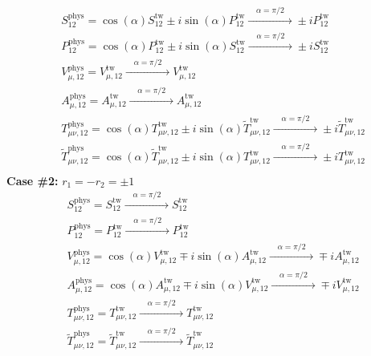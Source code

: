 \documentclass[english, LaM, oneside, noexaminfo]{sapthesis}
\begin{document}
\begin{equation}\label{eq:OS-twisted-currents-equal-r}
    \begin{aligned}
        & S_{12}^\text{phys} = \cos (\alpha) S_{12}^\text{tw} \pm i \sin (\alpha) P_{12}^\text{tw} \xrightarrow{\quad \alpha = \pi/2 \quad} \pm i P^\text{tw}_{12}\\
        & P_{12}^\text{phys} = \cos (\alpha) P_{12}^\text{tw} \pm i \sin (\alpha) S_{12}^\text{tw} \xrightarrow{\quad \alpha = \pi/2 \quad} \pm i S^\text{tw}_{12}\\
        & V_{\mu,12}^\text{phys} = V_{\mu,12}^\text{tw} \xrightarrow{\quad \alpha = \pi/2 \quad} V_{\mu,12}^\text{tw}\\
        & A_{\mu,12}^\text{phys} = A_{\mu,12}^\text{tw} \xrightarrow{\quad \alpha = \pi/2 \quad} A_{\mu,12}^\text{tw}\\
        & T_{\mu\nu,12}^\text{phys} = \cos (\alpha) T_{\mu\nu,12}^\text{tw} \pm i \sin (\alpha) \tilde{T}_{\mu\nu,12}^\text{tw} \xrightarrow{\quad \alpha = \pi/2 \quad} \pm i \tilde{T}_{\mu\nu,12}^\text{tw} \\
        & \tilde{T}_{\mu\nu,12}^\text{phys} = \cos (\alpha) \tilde{T}_{\mu\nu,12}^\text{tw} \pm i \sin (\alpha) T_{\mu\nu,12}^\text{tw} \xrightarrow{\quad \alpha = \pi/2 \quad} \pm i T_{\mu\nu,12}^\text{tw} \\
    \end{aligned}
\end{equation}
\newline
{\bf Case \#2: } $r_1 = - r_2 = \pm 1$
\begin{equation}\label{eq:OS-twisted-currents-defferent-r}
    \begin{aligned}
        & S_{12}^\text{phys} = S_{12}^\text{tw} \xrightarrow{\quad \alpha = \pi/2 \quad} S^\text{tw}_{12}\\
        & P_{12}^\text{phys} = P_{12}^\text{tw} \xrightarrow{\quad \alpha = \pi/2 \quad} P^\text{tw}_{12}\\
        & V_{\mu,12}^\text{phys} = \cos (\alpha) V_{\mu,12}^\text{tw} \mp i \sin (\alpha) A_{\mu,12}^\text{tw} \xrightarrow{\quad \alpha = \pi/2 \quad} \mp i A^\text{tw}_{\mu,12} \\
        & A_{\mu,12}^\text{phys} = \cos (\alpha) A_{\mu,12}^\text{tw} \mp i \sin (\alpha) V_{\mu,12}^\text{tw} \xrightarrow{\quad \alpha = \pi/2 \quad} \mp i V^\text{tw}_{\mu,12} \\
        & T_{\mu\nu,12}^\text{phys} = T_{\mu\nu,12}^\text{tw} \xrightarrow{\quad \alpha = \pi/2 \quad} T_{\mu\nu,12}^\text{tw} \\
        & \tilde{T}_{\mu\nu,12}^\text{phys} = \tilde{T}_{\mu\nu,12}^\text{tw} \xrightarrow{\quad \alpha = \pi/2 \quad} \tilde{T}_{\mu\nu,12}^\text{tw} \\
    \end{aligned}
\end{equation}
\end{document}
